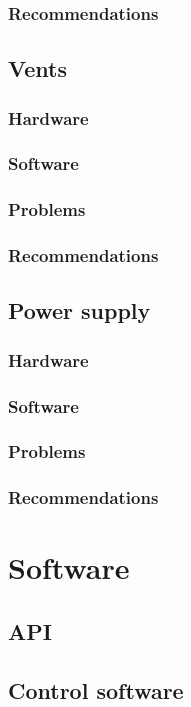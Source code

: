 \documentclass[a4paper,oneside]{book}
\begin{document}
\subsection{Recommendations}

\section{Vents}
\subsection{Hardware}
\subsection{Software}
\subsection{Problems}
\subsection{Recommendations}

\section{Power supply}
\subsection{Hardware}
\subsection{Software}
\subsection{Problems}
\subsection{Recommendations}

\chapter{Software}
\label{ch:software}
\section{API}
\section{Control software}
\end{document}
